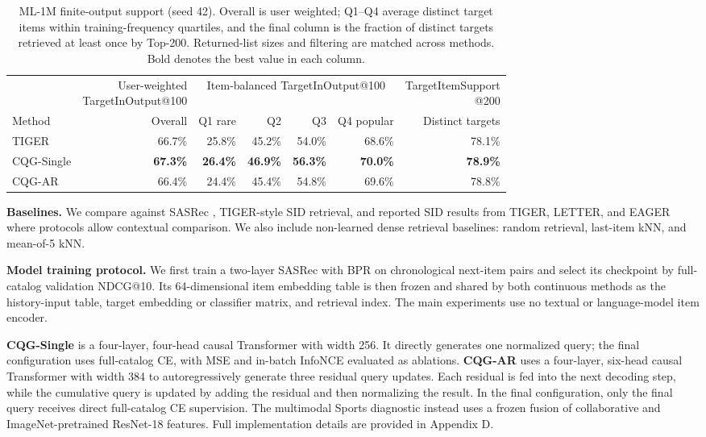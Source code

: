 \documentclass[preprint,12pt]{elsarticle}
\begin{document}
\begin{table}[!t]
\centering
\small
\setlength{\tabcolsep}{4pt}
\renewcommand{\arraystretch}{0.5}
\begin{adjustbox}{max width=\linewidth}
\begin{tabular}{lrrrrrr}
\toprule
& \shortstack{User-weighted\\TargetInOutput@100} &
\multicolumn{4}{c}{Item-balanced TargetInOutput@100} &
\shortstack{TargetItemSupport\\@200} \\
\cmidrule(lr){3-6}
Method & Overall & Q1 rare & Q2 & Q3 & Q4 popular & Distinct targets \\
\midrule
TIGER & 66.7\% & 25.8\% & 45.2\% & 54.0\% & 68.6\% & 78.1\% \\
CQG-Single & \textbf{67.3\%} & \textbf{26.4\%} & \textbf{46.9\%} & \textbf{56.3\%} & \textbf{70.0\%} & \textbf{78.9\%} \\
CQG-AR & 66.4\% & 24.4\% & 45.4\% & 54.8\% & 69.6\% & 78.8\% \\
\bottomrule
\end{tabular}
\end{adjustbox}
\caption{ML-1M finite-output support (seed 42). Overall is user weighted;
Q1--Q4 average distinct target items within training-frequency quartiles, and
the final column is the fraction of distinct targets retrieved at least once
by Top-200. Returned-list sizes and filtering are matched across methods.
Bold denotes the best value in each column.}
\label{tab:target-support-comparison}
\end{table}



\textbf{Baselines.} We compare against SASRec \citep{kang2018sasrec}, TIGER-style SID retrieval, and reported SID results from TIGER, LETTER, and EAGER where protocols allow contextual comparison. We also include non-learned dense retrieval baselines: random retrieval, last-item kNN, and mean-of-5 kNN.

\textbf{Model training protocol.}
We first train a two-layer SASRec with BPR on chronological next-item pairs and select its checkpoint by full-catalog validation NDCG@10. Its 64-dimensional item embedding table is then frozen and shared by both continuous methods as the history-input table, target embedding or classifier matrix, and retrieval index. The main experiments use no textual or language-model item encoder.

\textbf{CQG-Single} is a four-layer, four-head causal Transformer with width
256. It directly generates one normalized query; the final configuration uses
full-catalog CE, with MSE and in-batch InfoNCE evaluated as ablations.
\textbf{CQG-AR} uses a four-layer, six-head causal Transformer with width 384
to autoregressively generate three residual query updates. Each residual is
fed into the next decoding step, while the cumulative query is updated by
adding the residual and then normalizing the result. In the final
configuration, only the final query receives direct full-catalog CE
supervision. The multimodal Sports diagnostic instead uses a frozen fusion of
collaborative and ImageNet-pretrained ResNet-18 features. Full implementation
details are provided in Appendix D.
\end{document}
